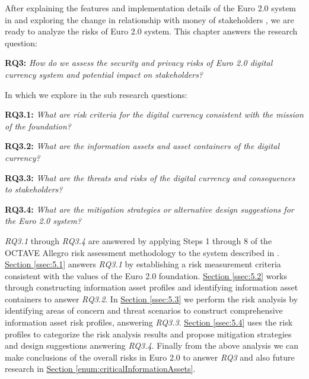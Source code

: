 \documentclass[a4paper,12pt]{article} %
\newcommand{\hypernameref}[1]{\hyperref[#1]{\nameref{#1}}}
\newcommand{\hypersectionref}[1]{\hyperref[#1]{Section \ref{#1}}}
\begin{document}
{After explaining the features and implementation details of the Euro 2.0 system in \hypernameref{sec:3} and exploring the change in relationship with money of stakeholders \hypernameref{sec:4}, we are ready to analyze the risks of Euro 2.0 system. This chapter answers the research question:

\begin{quoting}
	\textbf{RQ3:} \textit{How do we assess the security and privacy risks of Euro 2.0 digital currency system and potential impact on stakeholders?}
\end{quoting}

In which we explore in the sub research questions:
\begin{quoting}
	\textbf{RQ3.1: }\textit{What are risk criteria for the digital currency consistent with the mission of the foundation?}
\end{quoting}
\begin{quoting}
	\textbf{RQ3.2: }\textit{What are the information assets and asset containers of the digital currency?}
\end{quoting}
\begin{quoting}
	\textbf{RQ3.3: }\textit{What are the threats and risks of the digital currency and consequences to stakeholders?}
\end{quoting}
\begin{quoting}
	\textbf{RQ3.4: }\textit{What are the mitigation strategies or alternative design suggestions for the Euro 2.0 system?}
\end{quoting}

\textit{RQ3.1} through \textit{RQ3.4} are answered by applying Steps 1 through 8 of the OCTAVE Allegro risk assessment methodology\cite{CaralliIntroducingOCTAVE2007} to the system described in \hypernameref{sec:3}. \hypersectionref{ssec:5.1} answers \textit{RQ3.1} by establishing a risk measurement criteria consistent with the values of the Euro 2.0 foundation. \hypersectionref{ssec:5.2} works through constructing information asset profiles and identifying information asset containers to answer \textit{RQ3.2}. In \hypersectionref{ssec:5.3} we perform the risk analysis by identifying areas of concern and threat scenarios to construct comprehensive information asset risk profiles, answering \textit{RQ3.3}. \hypersectionref{ssec:5.4} uses the risk profiles to categorize the risk analysis results and propose mitigation strategies and design suggestions answering \textit{RQ3.4}. Finally from the above analysis we can make conclusions of the overall risks in Euro 2.0 to answer \textit{RQ3} and also future research in \hypersectionref{enum:criticalInformationAssets}.

}
\end{document}
